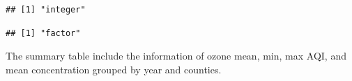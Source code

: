 \documentclass[12pt,]{article}
\newenvironment{Shaded}{\begin{snugshade}}{\end{snugshade}}
\newcommand{\KeywordTok}[1]{\textcolor[rgb]{0.13,0.29,0.53}{\textbf{#1}}}
\newcommand{\FloatTok}[1]{\textcolor[rgb]{0.00,0.00,0.81}{#1}}
\newcommand{\OperatorTok}[1]{\textcolor[rgb]{0.81,0.36,0.00}{\textbf{#1}}}
\newcommand{\NormalTok}[1]{#1}
\begin{document}
\begin{Shaded}
\end{Shaded}

\begin{verbatim}
## [1] "integer"
\end{verbatim}

\begin{Shaded}
\end{Shaded}

\begin{verbatim}
## [1] "factor"
\end{verbatim}

\pagebreak
The summary table include the information of ozone mean, min, max AQI,
and mean concentration grouped by year and counties.
\end{document}

